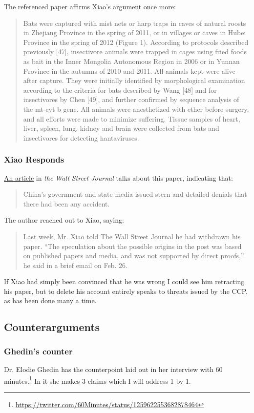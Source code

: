 \documentclass[11pt]{article}
\begin{document}
The referenced paper affirms Xiao's argument once more:
\begin{quote}
Bats were captured with mist nets or harp traps in caves of natural roosts in Zhejiang Province in the spring of 2011, or in villages or caves in Hubei Province in the spring of 2012 (Figure 1). According to protocols described previously [47], insectivore animals were trapped in cages using fried foods as bait in the Inner Mongolia Autonomous Region in 2006 or in Yunnan Province in the autumns of 2010 and 2011. All animals kept were alive after capture. They were initially identified by morphological examination according to the criteria for bats described by Wang [48] and for insectivores by Chen [49], and further confirmed by sequence analysis of the mt-cyt b gene. All animals were anesthetized with ether before surgery, and all efforts were made to minimize suffering. Tissue samples of heart, liver, spleen, lung, kidney and brain were collected from bats and insectivores for detecting hantaviruses.
\end{quote}

\subsubsection{Xiao Responds}
\label{sec:org5cfc298}
\href{https://archive.is/EzAt5}{An article} in \emph{the Wall Street Journal} talks about this paper, indicating that:
\begin{quote}
China’s government and state media issued stern and detailed denials that there had been any accident.
\end{quote}

The author reached out to Xiao, saying:
\begin{quote}
Last week, Mr. Xiao told The Wall Street Journal he had withdrawn his paper. “The speculation about the possible origins in the post was based on published papers and media, and was not supported by direct proofs,” he said in a brief email on Feb. 26.
\end{quote}

If Xiao had simply been convinced that he was wrong I could see him retracting his paper, but to delete his account entirely speaks to threats issued by the CCP, as has been done many a time.

\subsection{Counterarguments}
\label{sec:orgcb071fc}
\subsubsection{Ghedin's counter}
\label{sec:org778e7f2}
Dr. Elodie Ghedin has the counterpoint laid out in her interview with 60 minutes.\footnote{\url{https://twitter.com/60Minutes/status/1259622553682878464}} In it she makes 3 claims which I will address 1 by 1.
\end{document}
